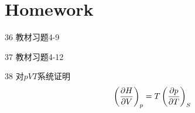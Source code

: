 \documentclass[CJK]{beamer}
\begin{document}
\section{Homework}

\begin{frame}
  \bch
  \bitem
\item[36]{教材习题4-9}
\item[37]{教材习题4-12}
\item[38]{对$pVT$系统证明  $$\left(\frac{\partial H}{\partial V}\right)_{p} = T\left(\frac{\partial p}{\partial T}\right)_{S} $$}
\eitem
  
  \ech
\end{frame}
\end{document}
